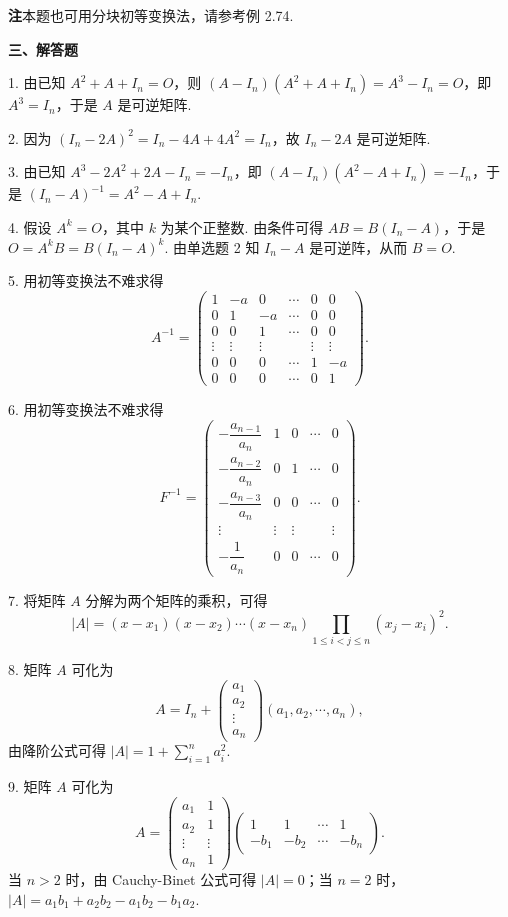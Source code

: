 \documentclass[UTF8, 12pt, fontset=fandol, oneside]{ctexart}
\begin{document}
\noindent\textbf{注}\quad 本题也可用分块初等变换法，请参考例 2.74.

\noindent\textbf{三、解答题}

1. 由已知 $A^2+A+I_n=O$，则 $(A-I_n)(A^2+A+I_n)=A^3-I_n=O$，即 $A^3=I_n$，于是 $A$ 是可逆矩阵.

2. 因为 $(I_n-2A)^2=I_n-4A+4A^2=I_n$，故 $I_n-2A$ 是可逆矩阵.

3. 由已知 $A^3-2A^2+2A-I_n=-I_n$，即 $(A-I_n)(A^2-A+I_n)=-I_n$，于是 $(I_n-A)^{-1}=A^2-A+I_n$.

4. 假设 $A^k=O$，其中 $k$ 为某个正整数. 由条件可得 $AB=B(I_n-A)$，于是 $O=A^kB=B(I_n-A)^k$. 由单选题 2 知 $I_n-A$ 是可逆阵，从而 $B=O$.

5. 用初等变换法不难求得
\[
A^{-1}=
\left(
\begin{array}{rrrrrr}
1 & -a & 0 & \cdots & 0 & 0\\
0 & 1 & -a & \cdots & 0 & 0\\
0 & 0 & 1 & \cdots & 0 & 0\\
\vdots & \vdots & \vdots & & \vdots & \vdots\\
0 & 0 & 0 & \cdots & 1 & -a\\
0 & 0 & 0 & \cdots & 0 & 1
\end{array}
\right).
\]

6. 用初等变换法不难求得
\[
F^{-1}=
\left(
\begin{array}{ccccc}
-\dfrac{a_{n-1}}{a_n} & 1 & 0 & \cdots & 0\\
-\dfrac{a_{n-2}}{a_n} & 0 & 1 & \cdots & 0\\
-\dfrac{a_{n-3}}{a_n} & 0 & 0 & \cdots & 0\\
\vdots & \vdots & \vdots & & \vdots\\
-\dfrac1{a_n} & 0 & 0 & \cdots & 0
\end{array}
\right).
\]

7. 将矩阵 $A$ 分解为两个矩阵的乘积，可得
\[
|A|=(x-x_1)(x-x_2)\cdots(x-x_n)
\prod_{1\le i<j\le n}(x_j-x_i)^2.
\]

8. 矩阵 $A$ 可化为
\[
A=I_n+
\left(
\begin{array}{c}
a_1\\
a_2\\
\vdots\\
a_n
\end{array}
\right)
(a_1,a_2,\cdots,a_n),
\]
由降阶公式可得 $|A|=1+\sum\limits_{i=1}^n a_i^2$.

9. 矩阵 $A$ 可化为
\[
A=
\left(
\begin{array}{cc}
a_1 & 1\\
a_2 & 1\\
\vdots & \vdots\\
a_n & 1
\end{array}
\right)
\left(
\begin{array}{cccc}
1 & 1 & \cdots & 1\\
-b_1 & -b_2 & \cdots & -b_n
\end{array}
\right).
\]
当 $n>2$ 时，由 Cauchy-Binet 公式可得 $|A|=0$；当 $n=2$ 时，$|A|=a_1b_1+a_2b_2-a_1b_2-b_1a_2$.
\end{document}
